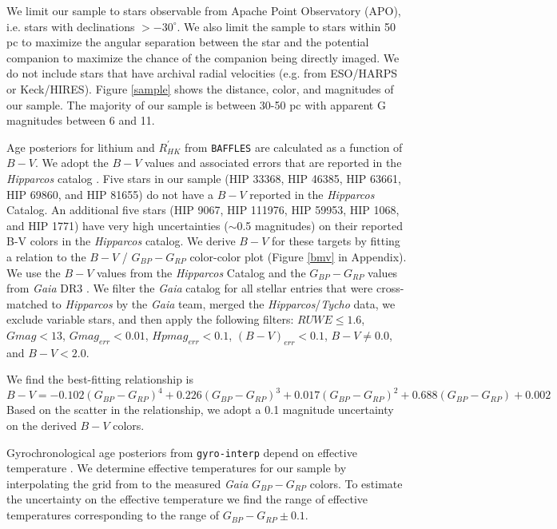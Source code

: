 We limit our sample to stars observable from Apache Point Observatory (APO), i.e. stars with declinations $>-30^{\circ}$. We also limit the sample to stars within 50 pc to maximize the angular separation between the star and the potential companion to maximize the chance of the companion being directly imaged. We do not include stars that have archival radial velocities (e.g. from ESO/HARPS or Keck/HIRES). Figure \ref{sample} shows the distance, color, and magnitudes of our sample. The majority of our sample is between 30-50 pc with apparent G magnitudes between 6 and 11.



 
 Age posteriors for lithium and $R^{'}_{HK}$ from \texttt{BAFFLES} \citep{2020ApJ...898...27S} are calculated as a function of $B-V$. We adopt the $B-V$ values and associated errors that are reported in the \textit{Hipparcos} catalog \citep{1997A&A...323L..61V}. Five stars in our sample (HIP 33368, HIP 46385, HIP 63661, HIP 69860, and HIP 81655) do not have a $B-V$ reported in the \textit{Hipparcos} Catalog. An additional five stars (HIP 9067, HIP 111976, HIP 59953, HIP 1068, and HIP 1771) have very high uncertainties ($\sim$0.5 magnitudes) on their reported B-V colors in the \textit{Hipparcos} catalog. We derive $B-V$ for these targets by fitting a relation to the $B-V$ / $G_{BP}-G_{RP}$ color-color plot (Figure \ref{bmv} in Appendix). We use the $B-V$ values from the \textit{Hipparcos} Catalog \citep{1997A&A...323L..61V} and the $G_{BP}-G_{RP}$ values from \textit{Gaia} DR3 \citep{2023A&A...674A...1G}. We filter the \textit{Gaia} catalog for all stellar entries that were cross-matched to \textit{Hipparcos} by the \textit{Gaia} team, merged the \textit{Hipparcos}/\textit{Tycho} data, we exclude variable stars, and then apply the following filters: $RUWE \leq 1.6$, $Gmag<13$, $Gmag_{err}<0.01$, $Hpmag_{err}<0.1$, $(B-V)_{err}<0.1$, $B-V\neq0.0$, and $B-V<2.0$.

 We find the best-fitting relationship is
 \begin{equation}
 B-V = -0.102(G_{BP}-G_{RP})^{4} + 0.226(G_{BP}-G_{RP})^{3}+0.017(G_{BP}-G_{RP})^{2}+0.688(G_{BP}-G_{RP})+0.002  
\end{equation} Based on the scatter in the relationship, we adopt a 0.1 magnitude uncertainty on the derived $B-V$ colors.
 
 Gyrochronological age posteriors from \texttt{gyro-interp} depend on effective temperature \citep{2023ApJ...947L...3B}. We determine effective temperatures for our sample by interpolating the grid from \cite{2013ApJS..208....9P} to the measured \textit{Gaia} $G_{BP}-G_{RP}$ colors. To estimate the uncertainty on the effective temperature we find the range of effective temperatures corresponding to the range of $G_{BP}-G_{RP}\pm0.1$.


